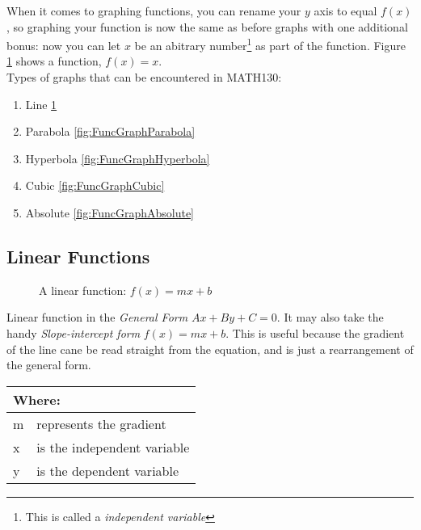 When it comes to graphing functions, you can rename your $y$ axis to equal
$f(x)$, so graphing your function is now the same as before graphs with one
additional bonus: now you can let $x$ be an abitrary number\footnote{This is
called a \emph{independent variable}} as part of the function. Figure
\ref{fig:FuncGraphLinear} shows a function, $f(x) = {x}$.\\
Types of graphs that can be encountered in MATH130:\\
\begin{enumerate}
  \item Line \ref{fig:FuncGraphLinear}
  \item Parabola \ref{fig:FuncGraphParabola}
  \item Hyperbola \ref{fig:FuncGraphHyperbola}
  \item Cubic \ref{fig:FuncGraphCubic}
  \item Absolute \ref{fig:FuncGraphAbsolute}
\end{enumerate}
%
\clearpage
\subsection{Linear Functions}
\label{Sec:LinearFunctions}
\begin{figure}[!hbt]
\label{fig:FuncGraphLinear}
\caption{A linear function: $f(x) = mx + b$}
\end{figure}
%
Linear function in the \emph{General Form} $Ax + By + C= 0$. It may also take
the handy \emph{Slope-intercept form} $ f(x) = mx + b $. This is useful because
the gradient of the line cane be read straight from the equation, and is just
a rearrangement of the general form. 
\begin{table}[!hbt]
\label{tab:PartsOfALinearFunction}
\begin{tabularx}{\linewidth}{| l X |}
  \hline
  \multicolumn{2}{|l|}{Where:} \\
  \hline \hline
  m & represents the gradient\\
  x & is the independent variable\\
  y & is the dependent variable\\
\hline
\end{tabularx}
\end{table}
%
\clearpage
